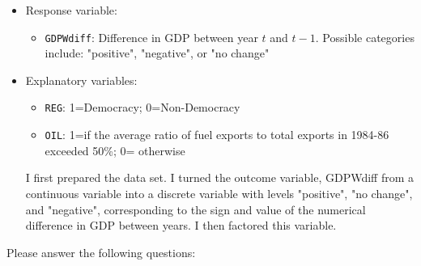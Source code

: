 \documentclass[12pt,letterpaper]{article}
\begin{document}
\begin{itemize}
	\item
	Response variable: 
	\begin{itemize}
		\item \texttt{GDPWdiff}: Difference in GDP between year $t$ and $t-1$. Possible categories include: "positive", "negative", or "no change"
	\end{itemize}
	\item
	Explanatory variables: 
	\begin{itemize}
		\item
		\texttt{REG}: 1=Democracy; 0=Non-Democracy
		\item
		\texttt{OIL}: 1=if the average ratio of fuel exports to total exports in 1984-86 exceeded 50\%; 0= otherwise
	\end{itemize}
	
		\noindent I first prepared the data set. I turned the outcome variable, GDPWdiff from a continuous variable into a discrete variable with levels "positive", "no change", and "negative", corresponding to the sign and value of the numerical difference in GDP between years. I then factored this variable.
	
	
	
	
	
\end{itemize}
\newpage
\noindent Please answer the following questions:
\end{document}
